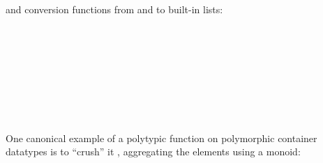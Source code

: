\documentclass[fleqn,runningheads]{llncs}
\begin{document}
and conversion functions from and to built-in lists:
\begin{code}%
\>[0]\AgdaSpace{}%
\AgdaSymbol{:}\AgdaSpace{}%
\AgdaSpace{}%
\AgdaSpace{}%
\AgdaSpace{}%
\AgdaSpace{}%
\<%
\\
\>[0]\AgdaSpace{}%
\AgdaSymbol{=}\AgdaSpace{}%
\AgdaSpace{}%
\AgdaSpace{}%
\<%
\\
%
\\[\AgdaEmptyExtraSkip]%
\>[0]\AgdaSpace{}%
\AgdaSymbol{:}\AgdaSpace{}%
\AgdaSpace{}%
\AgdaSpace{}%
\AgdaSpace{}%
\AgdaSpace{}%
\<%
\\
\>[0]\AgdaSpace{}%
\AgdaSymbol{=}\AgdaSpace{}%
\AgdaSpace{}%
\AgdaSpace{}%
\AgdaSpace{}%
\<%
\\
\>[0][@{}l@{\AgdaIndent{0}}]%
\>[2]\AgdaSpace{}%
\AgdaSymbol{:}\AgdaSpace{}%
\AgdaOperator{\AgdaFunction{[[}}\AgdaSpace{}%
\AgdaSpace{}%
\AgdaOperator{\AgdaFunction{]]B}}\AgdaSpace{}%
\AgdaSpace{}%
\AgdaSymbol{(}\AgdaSpace{}%
\AgdaSymbol{)}\AgdaSpace{}%
\AgdaSpace{}%
\AgdaSpace{}%
\<%
\\
%
\>[2]\AgdaSpace{}%
\AgdaSymbol{(}\AgdaSpace{}%
\AgdaSymbol{)}%
\>[26]\AgdaSymbol{=}\AgdaSpace{}%
\AgdaInductiveConstructor{[]}\<%
\\
%
\>[2]\AgdaSpace{}%
\AgdaSymbol{(}\AgdaSpace{}%
\AgdaSymbol{(}\AgdaSpace{}%
\AgdaSpace{}%
\AgdaOperator{\AgdaInductiveConstructor{,}}%
\>[19]\AgdaSpace{}%
\AgdaSymbol{))}%
\>[26]\AgdaSymbol{=}\AgdaSpace{}%
\AgdaSpace{}%
\AgdaSpace{}%
\<%
\end{code}
One canonical example of a polytypic function on polymorphic container datatypes is to ``crush'' it \cite{Meertens96:Calculate}, aggregating the elements using a monoid:
\end{document}
